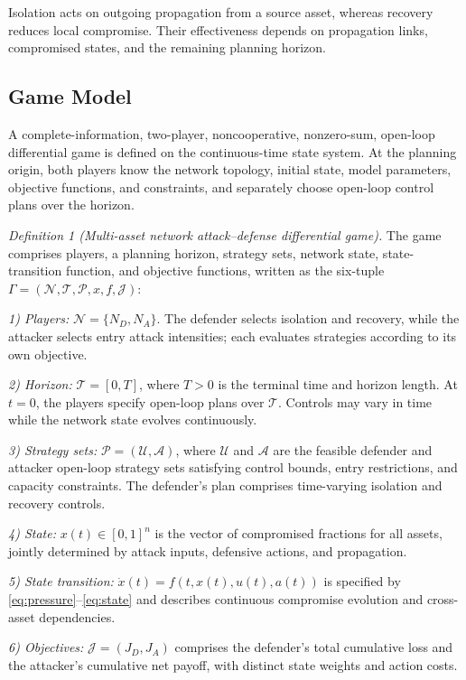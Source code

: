 \documentclass[conference,letterpaper]{IEEEtran}
\begin{document}
Isolation acts on outgoing propagation from a source asset, whereas recovery reduces local compromise. Their effectiveness depends on propagation links, compromised states, and the remaining planning horizon.

\subsection{Game Model}
A complete-information, two-player, noncooperative, nonzero-sum, open-loop differential game is defined on the continuous-time state system. At the planning origin, both players know the network topology, initial state, model parameters, objective functions, and constraints, and separately choose open-loop control plans over the horizon.

\emph{Definition 1 (Multi-asset network attack--defense differential game).} The game comprises players, a planning horizon, strategy sets, network state, state-transition function, and objective functions, written as the six-tuple $\Gamma=(\mathcal N,\mathcal T,\mathcal P,x,f,\mathcal J)$:

\emph{1) Players:} $\mathcal N=\{N_D,N_A\}$. The defender selects isolation and recovery, while the attacker selects entry attack intensities; each evaluates strategies according to its own objective.

\emph{2) Horizon:} $\mathcal T=[0,T]$, where $T>0$ is the terminal time and horizon length. At $t=0$, the players specify open-loop plans over $\mathcal T$. Controls may vary in time while the network state evolves continuously.

\emph{3) Strategy sets:} $\mathcal P=(\mathcal U,\mathcal A)$, where $\mathcal U$ and $\mathcal A$ are the feasible defender and attacker open-loop strategy sets satisfying control bounds, entry restrictions, and capacity constraints. The defender's plan comprises time-varying isolation and recovery controls.

\emph{4) State:} $x(t)\in[0,1]^n$ is the vector of compromised fractions for all assets, jointly determined by attack inputs, defensive actions, and propagation.

\emph{5) State transition:} $\dot x(t)=f(t,x(t),u(t),a(t))$ is specified by \eqref{eq:pressure}--\eqref{eq:state} and describes continuous compromise evolution and cross-asset dependencies.

\emph{6) Objectives:} $\mathcal J=(J_D,J_A)$ comprises the defender's total cumulative loss and the attacker's cumulative net payoff, with distinct state weights and action costs.
\end{document}
